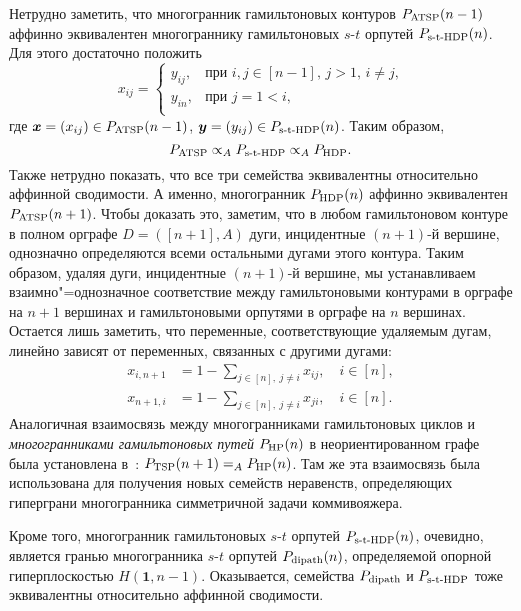 Нетрудно заметить, что многогранник гамильтоновых контуров $P_{\textup{ATSP}}(n-1)$ аффинно эквивалентен многограннику гамильтоновых $s$-$t$ орпутей $P_{\textup{s-t-HDP}}(n)$.
Для этого достаточно положить 
\[
x_{ij} = \begin{cases}
y_{ij}, & \text{при $i,j \in [n-1]$, $j > 1$, $i\ne j$,}\\
y_{in}, & \text{при $j = 1 < i$,}\\
\end{cases}
\]
где $\bm{x}=(x_{ij}) \in P_{\textup{ATSP}}(n-1)$, $\bm{y}=(y_{ij}) \in P_{\textup{s-t-HDP}}(n)$.
Таким образом,
\[
P_{\textup{ATSP}} \propto_A P_{\textup{s-t-HDP}} \propto_A P_{\textup{HDP}}.
\]
Также нетрудно показать, что все три семейства эквивалентны относительно аффинной сводимости.
А именно, многогранник $P_{\textup{HDP}}(n)$ аффинно эквивалентен $P_{\textup{ATSP}}(n+1)$.
Чтобы доказать это, заметим, что в любом гамильтоновом контуре в полном орграфе $D = ([n+1], A)$ дуги, инцидентные $(n+1)$-й вершине, однозначно определяются всеми остальными дугами этого контура. 
Таким образом, удаляя дуги, инцидентные $(n+1)$-й вершине, мы устанавливаем взаимно"=однозначное соответствие между гамильтоновыми контурами в орграфе на $n+1$ вершинах и гамильтоновыми орпутями в орграфе на $n$ вершинах.
Остается лишь заметить, что переменные, соответствующие удаляемым дугам, линейно зависят от переменных, связанных с другими дугами:
\begin{align*}
x_{i,n+1} &= 1 - \sum_{j \in [n],\ j \neq i} x_{ij}, \quad i\in[n],\\
x_{n+1,i} &= 1 - \sum_{j \in [n],\ j \neq i} x_{ji}, \quad i\in[n].
\end{align*}
Аналогичная взаимосвязь между многогранниками гамильтоновых циклов и \emph{многогранниками гамильтоновых путей} $P_{\textup{HP}}(n)$ в неориентированном графе была установлена в~\cite{Queyranne:1993}: $P_{\textup{TSP}}(n+1) =_A P_{\textup{HP}}(n)$. Там же эта взаимосвязь была использована для получения новых семейств неравенств, определяющих гиперграни многогранника симметричной задачи коммивояжера.

Кроме того, многогранник гамильтоновых $s$-$t$ орпутей $P_{\textup{s-t-HDP}}(n)$, очевидно, является гранью многогранника $s$-$t$ орпутей $P_{\textup{dipath}}(n)$,
определяемой опорной гиперплоскостью $H(\bm{1}, n-1)$.
Оказывается, семейства $P_{\textup{dipath}}$ и $P_{\textup{s-t-HDP}}$ тоже эквивалентны относительно аффинной сводимости.

